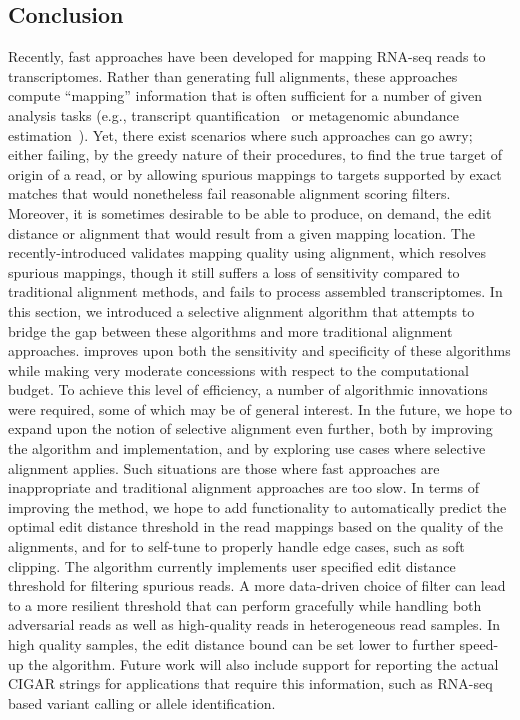 \subsection{Conclusion}
Recently, fast \nab approaches have been developed for mapping RNA-seq reads to transcriptomes. Rather than 
generating full alignments, these approaches compute ``mapping'' information that is often sufficient for 
a number of  given analysis tasks (e.g., transcript 
quantification~\citep{Patro2014Sailfish,zhang2014rna,Bray2016Kallisto,Patro2017Salmon,ju2017fleximer} 
or metagenomic abundance estimation~\citep{Schaeffer2017}). Yet, there exist scenarios where such \nab approaches 
can go awry; either failing, by the greedy nature of their procedures, to find the true target of origin of 
a read, or by allowing spurious mappings to targets supported by exact matches that would nonetheless fail 
reasonable alignment scoring filters. Moreover, it is sometimes desirable to be able to produce, on demand, 
the edit distance or alignment that would result from a given mapping location. The recently-introduced \hera 
validates mapping quality using alignment, which resolves spurious mappings, though it still suffers a loss of 
sensitivity compared to traditional alignment methods, and fails to process \denovo assembled transcriptomes. 
In this section, we introduced a selective alignment algorithm that attempts to bridge the gap between these \nab 
algorithms and more traditional alignment approaches. \Sla improves upon both the sensitivity and specificity 
of these \nab algorithms while making very moderate concessions with respect to the computational budget. 
To achieve this level of efficiency, a number of algorithmic innovations were required, some of which may be of 
general interest. In the future, we hope to expand upon the notion of selective alignment even further, both by 
improving the algorithm and implementation, and by exploring use cases where selective alignment applies. Such 
situations are those where fast \nab approaches are inappropriate and traditional alignment approaches are too 
slow. In terms of improving the method, we hope to add functionality to automatically predict the optimal edit 
distance threshold in the read mappings based on the quality of the alignments, and for \sla to self-tune to 
properly handle edge cases, such as soft clipping. The \sla algorithm currently implements user specified edit 
distance threshold for filtering spurious reads. A more data-driven choice of filter can lead to a more resilient 
threshold that can perform gracefully while handling both adversarial reads as well as high-quality reads in 
heterogeneous read samples. In high quality samples, the edit distance bound can be set lower to further 
speed-up the algorithm. Future work will also include support for reporting the actual CIGAR strings for 
applications that require this information, such as RNA-seq based variant calling or allele identification.

